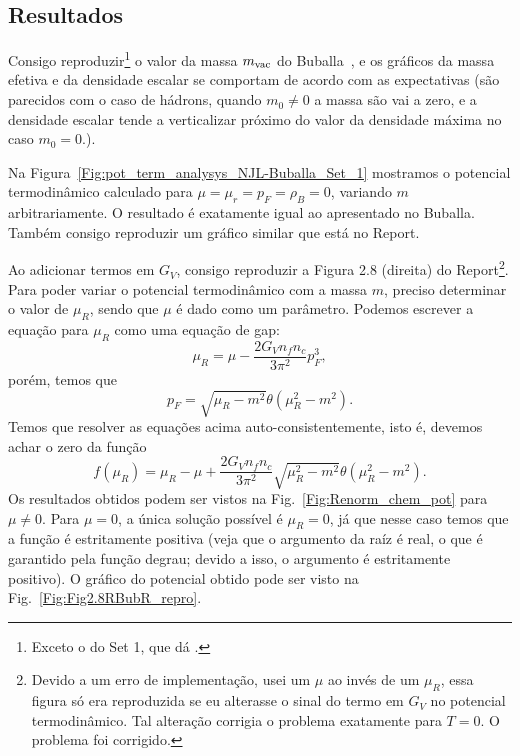 \subsection{Resultados}

Consigo reproduzir\footnote{Exceto o do Set 1, que dá .} o valor da massa $m_{\rm{vac}}$ do Buballa~\cite{Buballa1996}, e os gráficos da massa efetiva e da densidade escalar se comportam de acordo com as expectativas (são parecidos com o caso de hádrons, quando $m_0 \neq 0$ a massa são vai a zero, e a densidade escalar tende a verticalizar próximo do valor da densidade máxima no caso $m_0 = 0$.).

Na Figura~\ref{Fig:pot_term_analysys_NJL-Buballa_Set_1} mostramos o potencial termodinâmico calculado para $\mu = \mu_r = p_F = \rho_B = 0$, variando $m$ arbitrariamente. O resultado é exatamente igual ao apresentado no Buballa. Também consigo reproduzir um gráfico similar que está no Report.

Ao adicionar termos em $G_V$, consigo reproduzir a Figura 2.8 (direita) do Report\footnote{Devido a um erro de implementação, usei um $\mu$ ao invés de um $\mu_R$, essa figura só era reproduzida se eu alterasse o sinal do termo em $G_V$ no potencial termodinâmico. Tal alteração corrigia o problema exatamente para $T = 0$. O problema foi corrigido.}. Para poder variar o potencial termodinâmico com a massa $m$, preciso determinar o valor de $\mu_R$, sendo que $\mu$ é dado como um parâmetro. Podemos escrever a equação para $\mu_R$ como uma equação de gap:
\begin{equation}\label{Eq:Renorm_chem_pot_auto_1}
	\mu_R = \mu - \frac{2G_V n_fn_c}{3\pi^2}p_F^3,
\end{equation}
%
porém, temos que
\begin{equation}\label{Eq:Renorm_chem_pot_auto_2}
	p_F = \sqrt{\mu_R - m^2} \theta(\mu_R^2 - m^2).
\end{equation}
%
Temos que resolver as equações acima auto-consistentemente, isto é, devemos achar o zero da função
\begin{equation}
	f(\mu_R) = \mu_R - \mu + \frac{2G_V n_fn_c}{3\pi^2} \sqrt{\mu_R^2 - m^2}\theta(\mu_R^2 - m^2).
\end{equation}
%
Os resultados obtidos podem ser vistos na Fig.~\ref{Fig:Renorm_chem_pot} para $\mu \neq 0$. Para $\mu = 0$, a única solução possível é $\mu_R = 0$, já que nesse caso temos que a função é estritamente positiva (veja que o argumento da raíz é real, o que é garantido pela função degrau; devido a isso, o argumento é estritamente positivo). O gráfico do potencial obtido pode ser visto na Fig.~\ref{Fig:Fig2.8RBubR_repro}.

